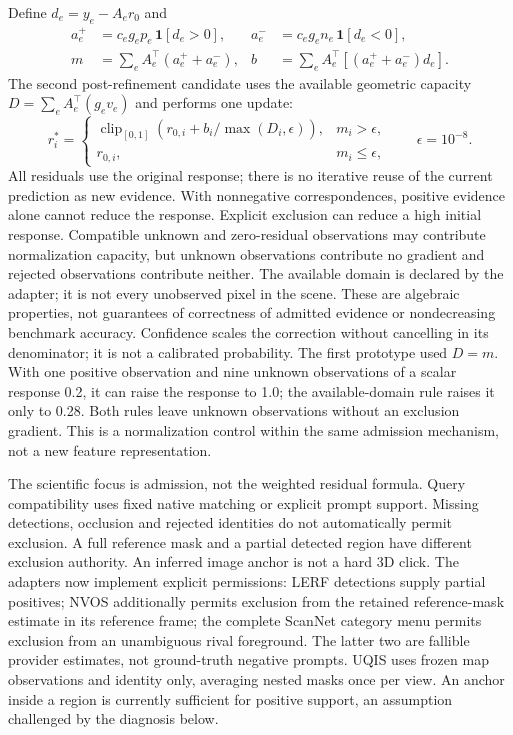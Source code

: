 \documentclass[10pt]{article}
\begin{document}
Define $d_e=y_e-A_e r_0$ and
\begin{align}
 a_e^+ &= c_e g_e p_e\,\mathbf{1}[d_e>0], &
 a_e^- &= c_e g_e n_e\,\mathbf{1}[d_e<0],\\
 m &= \sum_e A_e^\top(a_e^++a_e^-), &
 b &= \sum_e A_e^\top[(a_e^++a_e^-)d_e].
\end{align}
The second post-refinement candidate uses the available geometric capacity
$D=\sum_e A_e^\top(g_e v_e)$ and performs one update:
\begin{equation}
 r^*_i=\begin{cases}
 \operatorname{clip}_{[0,1]}(r_{0,i}+b_i/\max(D_i,\epsilon)),&m_i>\epsilon,\\
 r_{0,i},&m_i\leq\epsilon,
 \end{cases}\qquad \epsilon=10^{-8}.
\end{equation}
All residuals use the original response; there is no iterative reuse of the
current prediction as new evidence. With nonnegative correspondences, positive
evidence alone cannot reduce the response. Explicit exclusion can reduce a
high initial response. Compatible unknown and zero-residual observations may
contribute normalization capacity, but unknown observations contribute no
gradient and rejected observations contribute neither. The available domain is
declared by the adapter; it is not every unobserved pixel in the scene.
These are algebraic properties, not guarantees of correctness of admitted
evidence or nondecreasing benchmark accuracy. Confidence scales the correction
without cancelling in its denominator; it is not a calibrated probability.
The first prototype used $D=m$. With one positive observation and nine unknown
observations of a scalar response 0.2, it can raise the response to 1.0;
the available-domain rule raises it only to 0.28. Both rules leave unknown
observations without an exclusion gradient. This is a normalization control
within the same admission mechanism, not a new feature representation.

The scientific focus is admission, not the weighted residual formula.
Query compatibility uses fixed native matching or explicit prompt support.
Missing detections, occlusion and rejected identities do not automatically
permit exclusion. A full reference mask and a partial detected region have
different exclusion authority. An inferred image anchor is not a hard 3D click.
The adapters now implement explicit permissions: LERF detections supply partial
positives; NVOS additionally permits exclusion from the retained reference-mask
estimate in its reference frame; the complete ScanNet category menu permits
exclusion from an unambiguous rival foreground. The latter two are fallible
provider estimates, not ground-truth negative prompts. UQIS uses frozen map
observations and identity only, averaging nested masks once per view. An anchor
inside a region is currently sufficient for positive support, an assumption
challenged by the diagnosis below.
\end{document}
